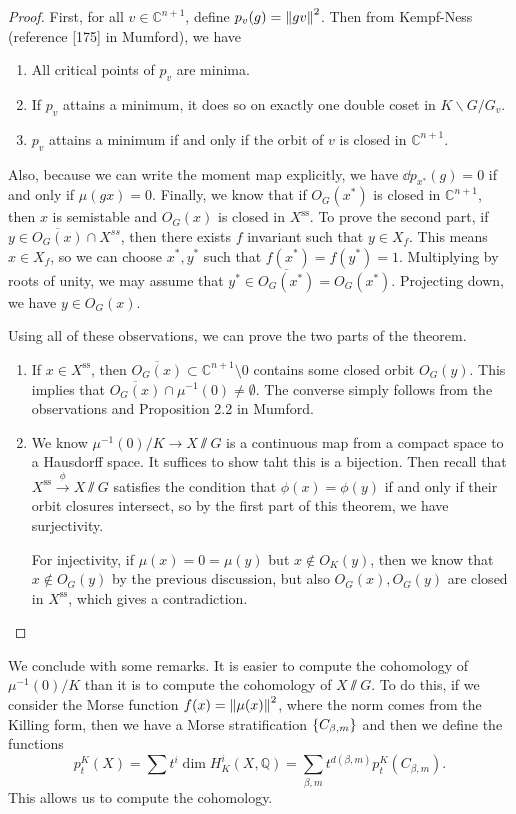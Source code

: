 \documentclass[leqno, openany]{memoir}
\theoremstyle{definition}
\theoremstyle{remark}
\theoremstyle{plain}
\theoremstyle{definition}
\theoremstyle{remark}
\newcommand{\C}{\mathbb{C}}
\newcommand{\Q}{\mathbb{Q}}
\newcommand{\mr}[1]{\mathrm{#1}}
\newcommand{\ol}[1]{\overline{#1}}
\begin{document}
\begin{proof}
    First, for all $v \in \C^{n+1}$, define $p_v(g) = \norm{gv}^2$. Then from Kempf-Ness (reference [175] in Mumford), we have
    \begin{enumerate}[label=(\roman*)]
        \item All critical points of $p_v$ are minima.
        \item If $p_v$ attains a minimum, it does so on exactly one double coset in $K \backslash G / G_v$.
        \item $p_v$ attains a minimum if and only if the orbit of $v$ is closed in $\C^{n+1}$.
    \end{enumerate}
    Also, because we can write the moment map explicitly, we have $\dd{p}_{x^*}(g) = 0$ if and only if $\mu(gx) = 0$. Finally, we know that if $O_G(x^*)$ is closed in $\C^{n+1}$, then $x$ is semistable and $O_G(x)$ is closed in $X^{\mr{ss}}$. To prove the second part, if $y \in \ol{O_G(x)} \cap X^{ss}$, then there exists $f$ invariant such that $y \in X_f$. This means $x \in X_f$, so we can choose $x^*, y^*$ such that $f(x^*) = f(y^*) = 1$. Multiplying by roots of unity, we may assume that $y^* \in \ol{O_G(x^*)} = O_G(x^*)$. Projecting down, we have $y \in O_G(x)$.

    Using all of these observations, we can prove the two parts of the theorem.
    \begin{enumerate}
        \item If $x \in X^{\mr{ss}}$, then $\ol{O_G(x)} \subset \C^{n+1} \setminus \qty{0}$ contains some closed orbit $O_G(y)$. This implies that $\ol{O_G(x)} \cap \mu^{-1}(0) \neq \emptyset$. The converse simply follows from the observations and Proposition 2.2 in Mumford.
        \item We know $\mu^{-1}(0)/K \to X \sslash G$ is a continuous map from a compact space to a Hausdorff space. It suffices to show taht this is a bijection. Then recall that $X^{\mr{ss}} \xrightarrow{\phi} X \sslash G$ satisfies the condition that $\phi(x) = \phi(y)$ if and only if their orbit closures intersect, so by the first part of this theorem, we have surjectivity.

            For injectivity, if $\mu(x) = 0 = \mu(y)$ but $x \notin O_K(y)$, then we know that $x \notin O_G(y)$ by the previous discussion, but also $O_G(x), O_G(y)$ are closed in $X^{\mr{ss}}$, which gives a contradiction. \qedhere
    \end{enumerate}
\end{proof}

We conclude with some remarks. It is easier to compute the cohomology of $\mu^{-1}(0) / K$ than it is to compute the cohomology of $X \sslash G$. To do this, if we consider the Morse function $f(x) = \norm{\mu(x)}^2$, where the norm comes from the Killing form, then we have a Morse stratification $\qty{C_{\beta, m}}$ and then we define the functions 
\[ p_t^K(X) = \sum t^i \dim H_K^i(X,\Q) = \sum_{\beta, m} t^{d(\beta, m)} p_t^K(C_{\beta, m}). \]
This allows us to compute the cohomology.
\end{document}
